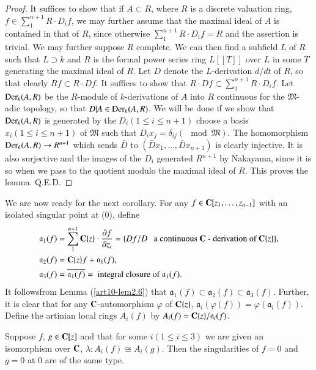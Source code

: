 \begin{proof}
It suffices to show that if $A\subset R$, where $R$ is a discrete valuation ring, $f \in \sum^{n+1}_1 R \cdot D_i f$, we may further assume that the maximal ideal of $A$ is contained in that of $R$, since otherwise $\sum^{n+1}_1 R \cdot D_i f = R$ and the assertion is trivial. We may further suppose $R$ complete. We can then find a subfield $L$ of $R$ such that $L \supset k$ and $R$ is the formal power series ring $L[[T]]$ over $L$ in some $T$ generating  the maximal ideal of $R$. Let $D$ denote the $L$-derivation $d/dt$ of $R$, so that clearly $R f \subset R \cdot Df$. It suffices to show that $R \cdot D f \subset \sum^{n+1}_1 R \cdot D_i f$. Let $\operatorname{Der}_k (A,R)$ be the $R$-module of $k$-derivations of $A$ into $R$ continuous for the $\mathfrak{M}$-adic topology, so that $D|A \in \operatorname{Der}_k(A,R)$. We will be done if we show that $\operatorname{Der}_k(A,R)$ is generated by the $D_i(1 \leqslant i \leqslant n+1)$ choose a basis $x_i (1 \leqslant i \leqslant n+1)$ of $\mathfrak{M}$ such that $D_i x_j = \delta_{ij}(\mod \mathfrak{M})$. The homomorphism $\operatorname{Der}_k(A,R) \to R^{n+1}$ which sends $\bar{D}$ to $(\bar{D}x_1, \ldots, \bar{D}x_{n+1})$ is clearly injective. It is also surjective and the images of the $D_i$ generated $R^{n+1}$ by Nakayama, since it is so when we pass to the quotient modulo the maximal ideal of $R$. This proves the lemma. \hfill{Q.E.D.}

\end{proof}

We are now ready for the next corollary. For any $f \in \mathbf{C}[z_1, \ldots, z_{n-1}]$ with an isolated singular point at (0), define 
\begin{align*}
\mathfrak{a}_1 (f) & = \sum\limits^{n+1}_1 \mathbf{C}\{z\}  \cdot \frac{\partial f}{\partial z_i} = \{Df/D \text{~~ a continuous $\mathbf{C}$ - derivation of $\mathbf{C} \{z\}$}\},\\
\mathfrak{a}_2 (f) & = \mathbf{C} \{z\} f + \mathfrak{a}_1(f),\\
\mathfrak{a}_3 (f) & = \overline{\mathfrak{a}_1 (f)} = \text{ integral closure of } \mathfrak{a}_1 (f).
\end{align*}
It follows\pageoriginale from Lemma (\ref{art10-lem2.6}) that $\mathfrak{a}_1 (f) \subset \mathfrak{a}_2 (f) \subset \mathfrak{a}_3(f)$. Further, it is clear that for any $\mathbf{C}$-automorphism $\varphi$ of $\mathbf{C}\{z\}$, $\mathfrak{a}_i (\varphi(f)) = \varphi (\mathfrak{a}_i (f))$. Define the artinian local rings $A_i(f)$ by $A_i(f) = \mathbf{C} \{z\} / \mathfrak{a}_i(f)$.

\begin{corollary}\label{art10-coro2.7}
Suppose $f$, $g \in \mathbf{C} [z]$ and that for some $i (1 \leqslant i \leqslant 3)$ we are given an isomorphism over $\mathbf{C}$, $\lambda : A_i (f) \cong A_i(g)$. Then the singularities of $f=0$ and $g =0$ at 0 are of the same type.
\end{corollary}

